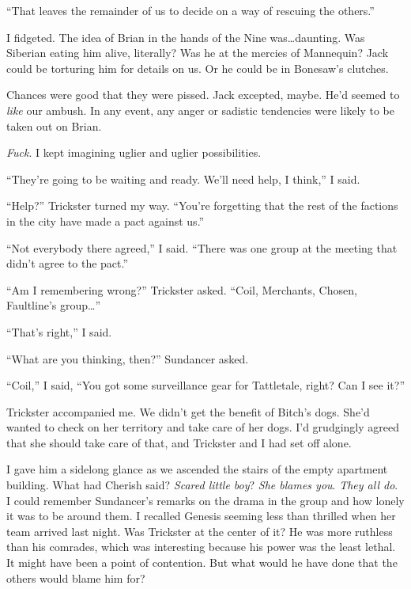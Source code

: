 ``That leaves the remainder of us to decide on a way of rescuing the others.''



I fidgeted.  The idea of Brian in the hands of the Nine was\ldots daunting.  Was Siberian eating him alive, literally?  Was he at the mercies of Mannequin?  Jack could be torturing him for details on us.  Or he could be in Bonesaw's clutches.



Chances were good that they were pissed.  Jack excepted, maybe.  He'd seemed to \emph{like} our ambush.  In any event, any anger or sadistic tendencies were likely to be taken out on Brian.



\emph{Fuck}.  I kept imagining uglier and uglier possibilities.



``They're going to be waiting and ready.  We'll need help, I think,'' I said.



``Help?'' Trickster turned my way.  ``You're forgetting that the rest of the factions in the city have made a pact against us.''



``Not everybody there agreed,'' I said.  ``There was one group at the meeting that didn't agree to the pact.''



``Am I remembering wrong?''  Trickster asked.  ``Coil, Merchants, Chosen, Faultline's group\ldots''



``That's right,'' I said.



``What are you thinking, then?''  Sundancer asked.



``Coil,'' I said, ``You got some surveillance gear for Tattletale, right?  Can I see it?''



\blacksquare



Trickster accompanied me.  We didn't get the benefit of Bitch's dogs.  She'd wanted to check on her territory and take care of her dogs.  I'd grudgingly agreed that she should take care of that, and Trickster and I had set off alone.



I gave him a sidelong glance as we ascended the stairs of the empty apartment building.  What had Cherish said?  \emph{Scared little boy}?  \emph{She blames you}.  \emph{They all do}.  I could remember Sundancer's remarks on the drama in the group and how lonely it was to be around them.  I recalled Genesis seeming less than thrilled when her team arrived last night.  Was Trickster at the center of it?  He was more ruthless than his comrades, which was interesting because his power was the least lethal.  It might have been a point of contention.  But what would he have done that the others would blame him for?



